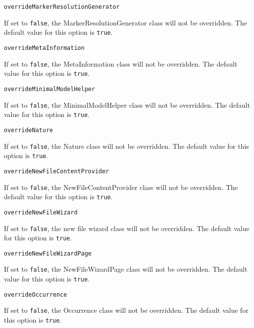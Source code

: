 \noindent\texttt{overrideMarkerResolutionGenerator}
\begin{myindentpar}{1cm}
If set to \texttt{false}, the MarkerResolutionGenerator class will not be overridden. The default value for this option is \texttt{true}.
\end{myindentpar}

\noindent\texttt{overrideMetaInformation}
\begin{myindentpar}{1cm}
If set to \texttt{false}, the MetaInformation class will not be overridden. The default value for this option is \texttt{true}.
\end{myindentpar}

\noindent\texttt{overrideMinimalModelHelper}
\begin{myindentpar}{1cm}
If set to \texttt{false}, the MinimalModelHelper class will not be overridden. The default value for this option is \texttt{true}.
\end{myindentpar}

\noindent\texttt{overrideNature}
\begin{myindentpar}{1cm}
If set to \texttt{false}, the Nature class will not be overridden. The default value for this option is \texttt{true}.
\end{myindentpar}

\noindent\texttt{overrideNewFileContentProvider}
\begin{myindentpar}{1cm}
If set to \texttt{false}, the NewFileContentProvider class will not be overridden. The default value for this option is \texttt{true}.
\end{myindentpar}

\noindent\texttt{overrideNewFileWizard}
\begin{myindentpar}{1cm}
If set to \texttt{false}, the new file wizard class will not be overridden. The default value for this option is \texttt{true}.
\end{myindentpar}

\noindent\texttt{overrideNewFileWizardPage}
\begin{myindentpar}{1cm}
If set to \texttt{false}, the NewFileWizardPage class will not be overridden. The default value for this option is \texttt{true}.
\end{myindentpar}

\noindent\texttt{overrideOccurrence}
\begin{myindentpar}{1cm}
If set to \texttt{false}, the Occurrence class will not be overridden. The default value for this option is \texttt{true}.
\end{myindentpar}

